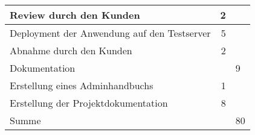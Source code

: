\begin{tabularx}{\textwidth}{Xrr}
    \rowcolor{odd}Review durch den Kunden & 2 &  \\ \hline
    Deployment der Anwendung auf den Testserver & 5 &  \\ \hline
    \rowcolor{odd}Abnahme durch den Kunden & 2 &  \\ \hline
    \rowcolor{heading} Dokumentation & & 9\  \\ \hline
    Erstellung eines Adminhandbuchs & 1 &  \\ \hline
    \rowcolor{odd}Erstellung der Projektdokumentation & 8 &  \\ \hline
    \rowcolor{heading} Summe &  & 80 \\ \hline
\end{tabularx}


